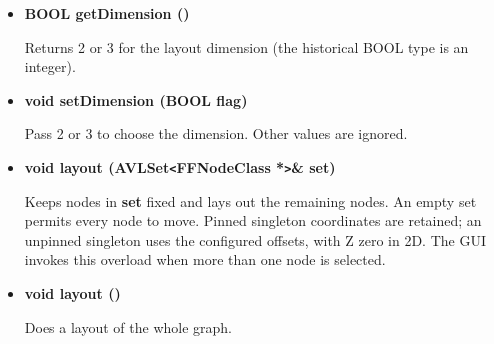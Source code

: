 \begin{itemize}
  Sets the singleton placement z-coordinate to {\bf z}.

\item{\bf  BOOL    getDimension ()}
  
  Returns 2 or 3 for the layout dimension (the historical BOOL type is an integer).

\item{\bf  void    setDimension (BOOL flag)}

  Pass 2 or 3 to choose the dimension. Other values are ignored.
  
\item{\bf  void    layout (AVLSet\verb|<|FFNodeClass *\verb|>|\& set)}
  
  Keeps nodes in {\bf set} fixed and lays out the remaining nodes.
  An empty set permits every node to move. Pinned singleton coordinates
  are retained; an unpinned singleton uses the configured offsets, with Z zero
  in 2D. The GUI invokes this overload when more than one node is selected.

\item{\bf  void    layout ()}
  
  Does a layout of the whole graph.

\end{itemize}

